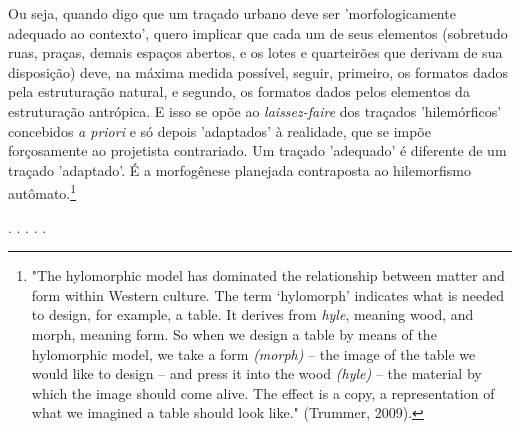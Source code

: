 \documentclass[]{report}
\begin{document}
	Ou seja, quando digo que um traçado urbano deve ser 'morfologicamente adequado ao contexto', quero implicar que cada um de seus elementos (sobretudo ruas, praças, demais espaços abertos, e os lotes e quarteirões que derivam de sua disposição) deve, na máxima medida possível, seguir, primeiro, os formatos dados pela estruturação natural, e segundo, os formatos dados pelos elementos da estruturação antrópica. E isso se opõe ao \textit{laissez-faire} dos traçados 'hilemórficos' concebidos \textit{a priori} e só depois 'adaptados' à realidade, que se impõe forçosamente ao projetista contrariado. Um traçado 'adequado' é diferente de um traçado 'adaptado'. É a morfogênese planejada contraposta ao hilemorfismo autômato.\footnote[1]{"The hylomorphic model has dominated the relationship between matter and form within Western culture. The term ‘hylomorph’ indicates what is needed to design, for example, a table. It derives from \textit{hyle}, meaning wood, and morph, meaning form. So when we design a table by means of the hylomorphic model, we take a form \textit{(morph)} – the image of the table we would like to design – and press it into the wood \textit{(hyle)} – the material by which the image should come alive. The effect is a copy, a representation of what we imagined a table should look like." (Trummer, 2009).}
	
	\begin{center}
		. . . . .
	\end{center}


	
\end{document}
